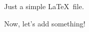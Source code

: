 \documentclass[preprint,showpacs,nofootinbib,floatfix]{revtex4-1}
\begin{document}
Just a simple \LaTeX\ file.

Now, let's add something!
\end{document}
